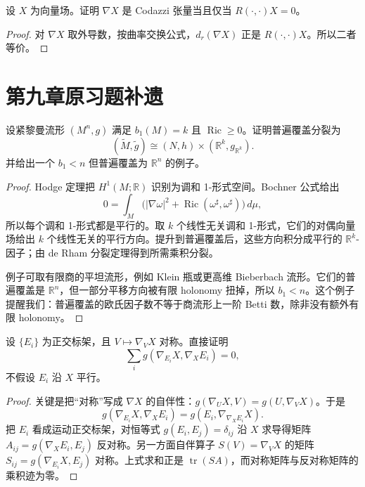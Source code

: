 \documentclass[11pt,a4paper,openany]{ctexbook}
\numberwithin{equation}{chapter}
\begin{document}
\begin{exercise}
设 \(X\) 为向量场。证明 \(\nabla X\) 是 Codazzi 张量当且仅当 \(R(\cdot,\cdot)X=0\)。
\end{exercise}
\begin{proof}
对 \(\nabla X\) 取外导数，按曲率交换公式，\(d_r(\nabla X)\) 正是 \(R(\cdot,\cdot)X\)。所以二者等价。
\end{proof}

\section{第九章原习题补遗}

\begin{exercise}
设紧黎曼流形 \((M^n,g)\) 满足 \(b_1(M)=k\) 且 \(\operatorname{Ric}\ge 0\)。证明普遍覆盖分裂为
\[
(\widetilde M,\widetilde g)\cong (N,h)\times(\mathbb R^k,g_{\mathbb R^k}).
\]
并给出一个 \(b_1<n\) 但普遍覆盖为 \(\mathbb R^n\) 的例子。
\end{exercise}
\begin{proof}
Hodge 定理把 \(H^1(M;\mathbb R)\) 识别为调和 1-形式空间。Bochner 公式给出
\[
0=\int_M\bigl(|\nabla \omega|^2+\operatorname{Ric}(\omega^\sharp,\omega^\sharp)\bigr)\,d\mu,
\]
所以每个调和 1-形式都是平行的。取 \(k\) 个线性无关调和 1-形式，它们的对偶向量场给出 \(k\) 个线性无关的平行方向。提升到普遍覆盖后，这些方向积分成平行的 \(\mathbb R^k\)-因子；由 de Rham 分裂定理得到所需乘积分裂。

例子可取有限商的平坦流形，例如 Klein 瓶或更高维 Bieberbach 流形。它们的普遍覆盖是 \(\mathbb R^n\)，但一部分平移方向被有限 holonomy 扭掉，所以 \(b_1<n\)。这个例子提醒我们：普遍覆盖的欧氏因子数不等于商流形上一阶 Betti 数，除非没有额外有限 holonomy。
\end{proof}

\begin{exercise}
设 \(\{E_i\}\) 为正交标架，且 \(V\mapsto \nabla_VX\) 对称。直接证明
\[
\sum_i g(\nabla_{E_i}X,\nabla_XE_i)=0,
\]
不假设 \(E_i\) 沿 \(X\) 平行。
\end{exercise}
\begin{proof}
关键是把“对称”写成 \(\nabla X\) 的自伴性：\(g(\nabla_UX,V)=g(U,\nabla_VX)\)。于是
\[
g(\nabla_{E_i}X,\nabla_XE_i)=g(E_i,\nabla_{\nabla_XE_i}X).
\]
把 \(E_i\) 看成运动正交标架，对恒等式 \(g(E_i,E_j)=\delta_{ij}\) 沿 \(X\) 求导得矩阵 \(A_{ij}=g(\nabla_XE_i,E_j)\) 反对称。另一方面自伴算子 \(S(V)=\nabla_VX\) 的矩阵 \(S_{ij}=g(\nabla_{E_i}X,E_j)\) 对称。上式求和正是 \(\operatorname{tr}(SA)\)，而对称矩阵与反对称矩阵的乘积迹为零。
\end{proof}
\end{document}
